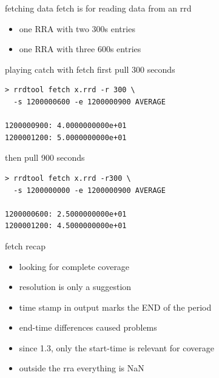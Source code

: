 
\begin{frame}{fetching data}
fetch is for reading data from an rrd

\begin{itemize}[<+-| alert@+>]
\item one RRA with two 300s entries
\item one RRA with three 600s entries
\end{itemize}
\end{frame}

\begin{frame}[fragile]{playing catch with fetch}
first pull 300 seconds
\begin{verbatim}
> rrdtool fetch x.rrd -r 300 \
  -s 1200000600 -e 1200000900 AVERAGE

1200000900: 4.0000000000e+01
1200001200: 5.0000000000e+01
\end{verbatim}

then pull 900 seconds
\begin{verbatim}
> rrdtool fetch x.rrd -r300 \
  -s 1200000000 -e 1200000900 AVERAGE

1200000600: 2.5000000000e+01
1200001200: 4.5000000000e+01
\end{verbatim}
\end{frame}

\begin{frame}{fetch recap}
\begin{itemize}[<+-| alert@+>]
\item looking for complete coverage
\item resolution is only a suggestion
\item time stamp in output marks the END of the period
\item end-time differences caused problems
\item since 1.3, only the start-time is relevant for coverage
\item outside the rra everything is NaN
\end{itemize}
\end{frame}


